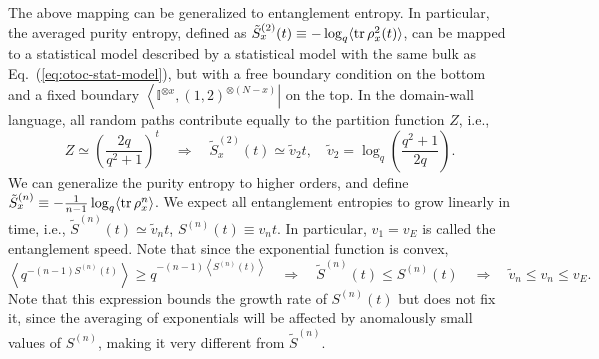 \documentclass{SciPost}
\begin{document}
The above mapping can be generalized to entanglement entropy.
In particular, the averaged purity entropy, defined as $\tilde S^{(2)}_x(t) \equiv -\log_q \langle \operatorname{tr}\rho_x^2(t)\rangle$, can be mapped to a statistical model described by a statistical model with the same bulk as Eq.~(\ref{eq:otoc-stat-model}), but with a free boundary condition on the bottom and a fixed boundary $\left\langle \mathbb I^{\otimes x},(1,2)^{\otimes (N-x)}\right|$ on the top.
In the domain-wall language, all random paths contribute equally to the partition function $Z$, i.e.,
\begin{equation}
	Z \simeq \left(\frac{2q}{q^2+1}\right)^t
	\quad\Longrightarrow\quad
	\tilde S^{(2)}_x(t) \simeq \tilde v_2 t,\quad
	\tilde v_2 =\log_q\left(\frac{q^2+1}{2q}\right).
\end{equation}
We can generalize the purity entropy to higher orders, and define $\tilde S_x^{(n)} \equiv -\frac{1}{n-1}\log_q\langle \operatorname{tr}\rho_x^n\rangle$.
We expect all entanglement entropies to grow linearly in time, i.e., $\tilde S^{(n)}(t) \simeq \tilde v_n t$, $S^{(n)}(t) \equiv v_n t$.
In particular, $v_1=v_E$ is called the entanglement speed.
Note that since the exponential function is convex, 
\begin{equation}
	\left\langle q^{-(n-1) S^{(n)}(t)} \right\rangle \ge q^{-(n-1)\left\langle S^{(n)}(t)\right\rangle} 
	\quad\Longrightarrow\quad
	\tilde S^{(n)}(t) \le S^{(n)}(t)
	\quad\Longrightarrow\quad
	\tilde v_n \le v_n\le v_E.
\end{equation}
Note that this expression bounds the growth rate of $S^{(n)}(t)$ but does not fix it, since the averaging of exponentials will be affected by anomalously small values of $S^{(n)}$, making it very different from $\tilde S^{(n)}$.
\end{document}
